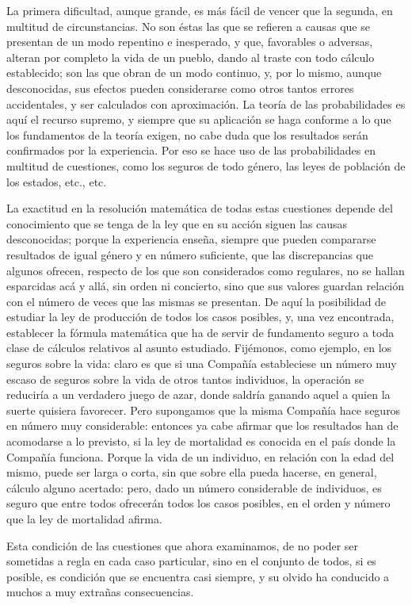 \documentclass[a4paper, 12pt]{article}
\begin{document}
La primera dificultad, aunque grande, es más fácil de vencer que la segunda, en multitud de circunstancias. No son éstas las que se refieren a causas que se presentan de un modo repentino e inesperado, y que, favorables o adversas, alteran por completo la vida de un pueblo, dando al traste con todo cálculo establecido; son las que obran de un modo continuo, y, por lo mismo, aunque desconocidas, sus efectos pueden considerarse como otros tantos errores accidentales, y ser calculados con aproximación. La teoría de las probabilidades es aquí el recurso supremo, y siempre que su aplicación se haga conforme a lo que los fundamentos de la teoría exigen, no cabe duda que los resultados serán confirmados por la experiencia. Por eso se hace uso de las probabilidades en multitud de cuestiones, como los seguros de todo género, las leyes de población de los estados, etc., etc.

La exactitud en la resolución matemática de todas estas cuestiones depende del conocimiento que se tenga de la ley que en su acción siguen las causas desconocidas; porque la experiencia enseña, siempre que pueden compararse resultados de igual género y en número suficiente, que las discrepancias que algunos ofrecen, respecto de los que son considerados como regulares, no se hallan esparcidas acá y allá, sin orden ni concierto, sino que sus valores guardan relación con el número de veces que las mismas se presentan. De aquí la posibilidad de estudiar la ley de producción de todos los casos posibles, y, una vez encontrada, establecer la fórmula matemática que ha de servir de fundamento seguro a toda clase de cálculos relativos al asunto estudiado. Fijémonos, como ejemplo, en los seguros sobre la vida: claro es que si una Compañía estableciese un número muy escaso de seguros sobre la vida de otros tantos individuos, la operación se reduciría a un verdadero juego de azar, donde saldría ganando aquel a quien la suerte quisiera favorecer. Pero supongamos que la misma Compañía hace seguros en número muy considerable: entonces ya cabe afirmar que los resultados han de acomodarse a lo previsto, si la ley de mortalidad es conocida en el país donde la Compañía funciona. Porque la vida de un individuo, en relación con la edad del mismo, puede ser larga o corta, sin que sobre ella pueda hacerse, en general, cálculo alguno acertado: pero, dado un número considerable de individuos, es seguro que entre todos ofrecerán todos los casos posibles, en el orden y número que la ley de mortalidad afirma.

Esta condición de las cuestiones que ahora examinamos, de no poder ser sometidas a regla en cada caso particular, sino en el conjunto de todos, si es posible, es condición que se encuentra casi siempre, y su olvido ha conducido a muchos a muy extrañas consecuencias.
\end{document}
